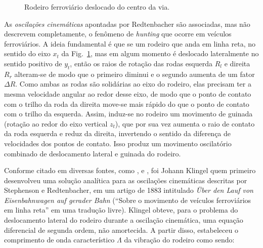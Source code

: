 \begin{figure}
    \centering
    \caption{Rodeiro ferroviário deslocado do centro da via.}
    \label{fig: rodeiro ferroviario desloc}
\end{figure}

As \textit{oscilações cinemáticas} apontadas por Redtenbacher são associadas, mas não descrevem completamente, o fenômeno
de \textit{hunting} que ocorre em veículos ferroviários. A ideia fundamental é que se um rodeiro que anda em linha reta, no
sentido do eixo $x_t$ da Fig.~\ref{fig: rodeiro ferroviario desloc}, mas em algum momento é deslocado lateralmente no sentido
positivo de $y_t$, então os raios de rotação das rodas esquerda $R_l$ e direita $R_r$ alteram-se de modo que o primeiro diminui
e o segundo aumenta de um fator $\Delta R$. Como ambas as rodas são solidárias ao eixo do rodeiro, elas precisam ter a mesma
velocidade angular ao redor desse eixo, de modo que o ponto de contato com o trilho da roda da direita move-se mais rápido do que o ponto de 
contato com o trilho da esquerda. Assim, induz-se no rodeiro um movimento de guinada (rotação ao redor do eixo vertical $z_t$),
que por sua vez aumenta o raio de contato da roda esquerda e reduz da direita, invertendo o sentido da diferença de velocidades
dos pontos de contato. Isso produz um movimento oscilatório combinado de deslocamento lateral e guinada do rodeiro.

Conforme citado em diversas fontes, como ,  e ,
foi Johann Klingel quem primeiro desenvolveu uma solução analítica para as oscilações cinemáticas descritas por Stephenson e Redtenbacher, 
em um artigo de 1883 intitulado \textit{Über den Lauf von Eisenbahnwagen auf gerader Bahn} (``Sobre o movimento de veículos ferroviários em 
linha reta'' em uma tradução livre). Klingel obteve, para o problema do deslocamento lateral do rodeiro durante a oscilação cinemática,
uma equação diferencial de segunda ordem, não amortecida. A partir disso, estabeleceu o comprimento de onda característico $\Lambda$ da vibração do
rodeiro como sendo:

